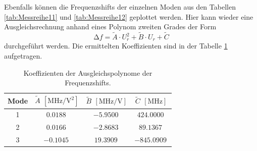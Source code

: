Ebenfalls können die Frequenzshifts der einzelnen Moden aus den Tabellen \ref{tab:Messreihe11} und \ref{tab:Messreihe12} geplottet werden. Hier kann wieder eine Ausgleichsrechnung anhand eines Polynom zweiten Grades der Form 
\begin{equation}
\increment f = \tilde{A} \cdot U_{r}^2 + \tilde{B} \cdot  U_{r} + \tilde{C}
\end{equation}
durchgeführt werden. Die ermittelten Koeffizienten sind in der Tabelle \ref{tab:12} aufgetragen.
\begin{table}
    \centering
    \caption{Koeffizienten der Ausgleichspolynome der Frequenzshifts.} 
    \label{tab:12}
    \begin{tabular}{c | c c c}
        \toprule
        Mode & $\tilde{A}$ $[\si{\mega\hertz\per\volt\squared}] $ & $\tilde{B} $ $[\si{\mega\hertz\per\volt}] $ & $\tilde{C}$ $[\si{\mega\hertz}]$ \\
        \midrule
        1      &      $\SI{0.0188}{}$        &       $\SI{-5.9500}{}$              &        $\SI{424.0000}{}$ \\
        2      &      $\SI{0.0166}{}$        &       $\SI{-2.8683}{}$              &        $\SI{89.1367}{}$ \\
        3      &      $\SI{-0.1045}{}$        &       $\SI{19.3909}{}$              &        $\SI{-845.0909}{}$ \\
        
    \end{tabular}
\end{table}

